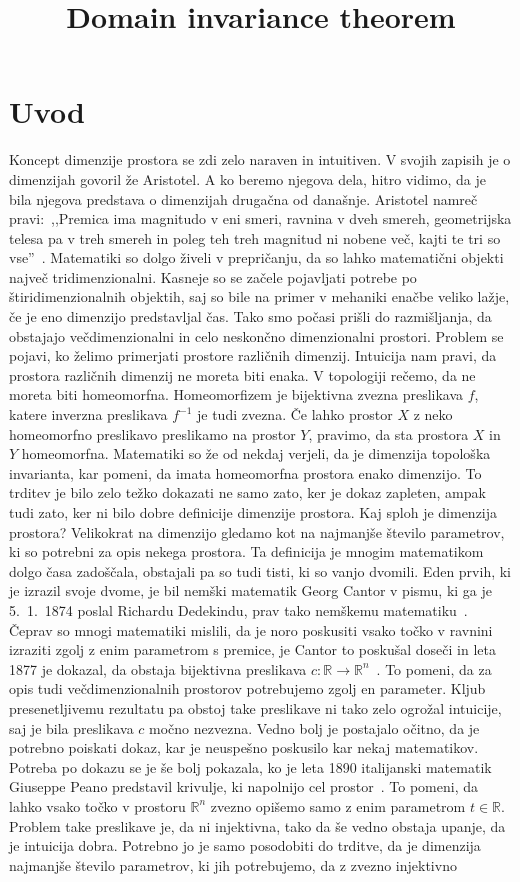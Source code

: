\documentclass[mat1]{fmfdelo}
\title{Domain invariance theorem}
\newcommand{\R}{\mathbb R}
\newcommand{\0}{0}
\def\citat#1{,,#1''}
\begin{document}
\section{Uvod}
Koncept dimenzije prostora se zdi zelo naraven in intuitiven. V svojih zapisih je o dimenzijah govoril že Aristotel. A ko beremo njegova dela, hitro vidimo, da je bila njegova predstava o dimenzijah drugačna od današnje. Aristotel namreč pravi:~\citat{Premica ima magnitudo v eni smeri, ravnina v dveh smereh, geometrijska telesa pa v treh smereh in poleg teh treh magnitud ni nobene več, kajti te tri so vse}~\cite[str.\ 1, moj prevod]{4dim}. Matematiki so dolgo živeli v prepričanju, da so lahko matematični objekti največ tridimenzionalni. Kasneje so se začele pojavljati potrebe po štiridimenzionalnih objektih, saj so bile na primer v mehaniki enačbe veliko lažje, če je eno dimenzijo predstavljal čas. Tako smo počasi prišli do razmišljanja, da obstajajo večdimenzionalni in celo neskončno dimenzionalni prostori. Problem se pojavi, ko želimo primerjati prostore različnih dimenzij. Intuicija nam pravi, da prostora različnih dimenzij ne moreta biti enaka. V topologiji rečemo, da ne moreta biti homeomorfna. Homeomorfizem je bijektivna zvezna preslikava $f$, katere inverzna preslikava $f^{-1}$ je tudi zvezna. Če lahko prostor $X$ z neko homeomorfno preslikavo preslikamo na prostor $Y$, pravimo, da sta prostora $X$ in $Y$ homeomorfna. Matematiki so že od nekdaj verjeli, da je dimenzija topološka invarianta, kar pomeni, da imata homeomorfna prostora enako dimenzijo. To trditev je bilo zelo težko dokazati ne samo zato, ker je dokaz zapleten, ampak tudi zato, ker ni bilo dobre definicije dimenzije prostora. Kaj sploh je dimenzija prostora? Velikokrat na dimenzijo gledamo kot na najmanjše število parametrov, ki so potrebni za opis nekega prostora. Ta definicija je mnogim matematikom dolgo časa zadoščala, obstajali pa so tudi tisti, ki so vanjo dvomili. Eden prvih, ki je izrazil svoje dvome, je bil nemški matematik Georg Cantor v pismu, ki ga je 5.\ 1.\ 1874 poslal Richardu Dedekindu, prav tako nemškemu matematiku~\cite[str.\ 201]{Gouvea2011}. Čeprav so mnogi matematiki mislili, da je noro poskusiti vsako točko v ravnini izraziti zgolj z enim parametrom s premice, je Cantor to poskušal doseči in leta 1877 je dokazal, da obstaja bijektivna preslikava $c : \R \to \R^n$~\cite[str.\ 203]{Gouvea2011}. To pomeni, da za opis tudi večdimenzionalnih prostorov potrebujemo zgolj en parameter. Kljub presenetljivemu rezultatu pa obstoj take preslikave ni tako zelo ogrožal intuicije, saj je bila preslikava $c$ močno nezvezna. Vedno bolj je postajalo očitno, da je potrebno poiskati dokaz, kar je neuspešno poskusilo kar nekaj matematikov. Potreba po dokazu se je še bolj pokazala, ko je leta 1890 italijanski matematik Giuseppe Peano predstavil krivulje, ki napolnijo cel prostor~\cite{Peano}. To pomeni, da lahko vsako točko v prostoru $\R^n$ zvezno opišemo samo z enim parametrom $t \in \R$. Problem take preslikave je, da ni injektivna, tako da še vedno obstaja upanje, da je intuicija dobra. Potrebno jo je samo posodobiti do trditve, da je dimenzija najmanjše število parametrov, ki jih potrebujemo, da z zvezno injektivno 
\end{document}
